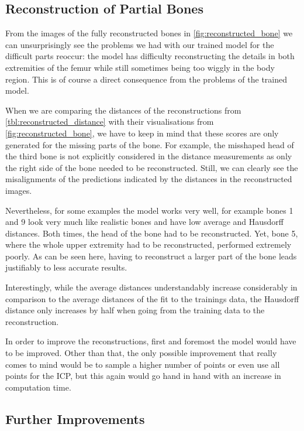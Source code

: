 
\subsection{Reconstruction of Partial Bones}
\label{subsec:reconresultsdisc}

From the images of the fully reconstructed bones in \autoref{fig:reconstructed_bone} we can unsurprisingly see the problems we had with our trained model for the difficult parts reoccur: the model has difficulty reconstructing the details in both extremities of the femur while still sometimes being too wiggly in the body region. This is of course a direct consequence from the problems of the trained model.

When we are comparing the distances of the reconstructions from \autoref{tbl:reconstructed_distance} with their visualisations from \autoref{fig:reconstructed_bone}, we have to keep in mind that these scores are only generated for the missing parts of the bone. For example, the misshaped head of the third bone is not explicitly considered in the distance measurements as only the right side of the bone needed to be reconstructed. Still, we can clearly see the misalignments of the predictions indicated by the distances in the reconstructed images.

Nevertheless, for some examples the model works very well, for example bones 1 and 9 look very much like realistic bones and have low average and Hausdorff distances. Both times, the head of the bone had to be reconstructed. Yet, bone 5, where the whole upper extremity had to be reconstructed, performed extremely poorly. As can be seen here, having to reconstruct a larger part of the bone leads justifiably to less accurate results.

Interestingly, while the average distances understandably increase considerably in comparison to the average distances of the fit to the trainings data, the Hausdorff distance only increases by half when going from the training data to the reconstruction.

In order to improve the reconstructions, first and foremost the model would have to be improved. Other than that, the only possible improvement that really comes to mind would be to sample a higher number of points or even use all points for the ICP, but this again would go hand in hand with an increase in computation time.

\subsection{Further Improvements}
\label{subsec:improvements}
